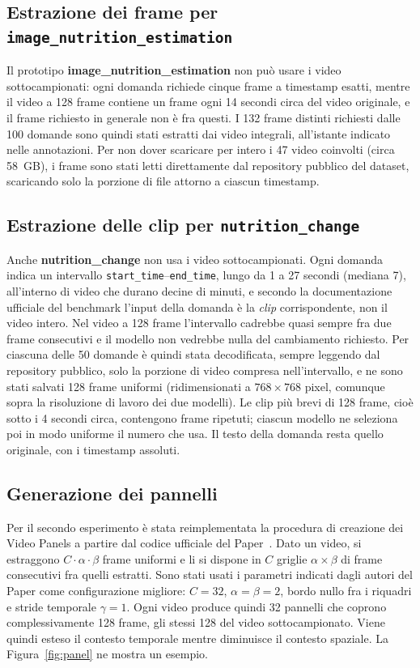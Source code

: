 \documentclass{article}
\begin{document}
\subsection{Estrazione dei frame per \texttt{image\_nutrition\_estimation}}

Il prototipo \textbf{image\_nutrition\allowbreak\_estimation} non può usare i video
sottocampionati: ogni domanda richiede cinque frame a timestamp esatti, mentre il
video a 128 frame contiene un frame ogni 14 secondi circa del video originale, e
il frame richiesto in generale non è fra questi. I 132 frame distinti richiesti
dalle 100 domande sono quindi stati estratti dai video integrali, all'istante
indicato nelle annotazioni. Per non dover scaricare per intero i 47 video
coinvolti (circa 58~GB), i frame sono stati letti direttamente dal repository
pubblico del dataset, scaricando solo la porzione di file attorno a ciascun
timestamp.

\subsection{Estrazione delle clip per \texttt{nutrition\_change}}

Anche \textbf{nutrition\allowbreak\_change} non usa i video sottocampionati. Ogni
domanda indica un intervallo \texttt{start\_time}--\texttt{end\_time}, lungo da 1 a
27 secondi (mediana 7), all'interno di video che durano decine di minuti, e
secondo la documentazione ufficiale del benchmark l'input della domanda è la
\emph{clip} corrispondente, non il video intero. Nel video a 128 frame
l'intervallo cadrebbe quasi sempre fra due frame consecutivi e il modello non
vedrebbe nulla del cambiamento richiesto. Per ciascuna delle 50 domande è quindi
stata decodificata, sempre leggendo dal repository pubblico, solo la porzione di
video compresa nell'intervallo, e ne sono stati salvati 128 frame uniformi
(ridimensionati a $768\times768$ pixel, comunque sopra la risoluzione di lavoro
dei due modelli). Le clip più brevi di 128 frame, cioè sotto i 4 secondi circa,
contengono frame ripetuti; ciascun modello ne seleziona poi in modo uniforme il
numero che usa. Il testo della domanda resta quello originale, con i timestamp
assoluti.

\subsection{Generazione dei pannelli}
\label{sec:panels-gen}

Per il secondo esperimento è stata reimplementata la procedura di creazione
dei Video Panels a partire dal codice ufficiale del Paper~\cite{videopanels}. Dato un video, si estraggono $C \cdot \alpha \cdot \beta$ frame
uniformi e li si dispone in $C$ griglie $\alpha \times \beta$ di frame
consecutivi fra quelli estratti. Sono stati usati i parametri indicati dagli autori del Paper come
configurazione migliore: $C=32$, $\alpha=\beta=2$, bordo nullo fra i riquadri e
stride temporale $\gamma=1$. Ogni video produce quindi 32 pannelli che coprono complessivamente 128 frame, gli stessi 128 del video
sottocampionato.  Viene quindi esteso il contesto temporale mentre diminuisce il contesto spaziale. La Figura~\ref{fig:panel} ne mostra un esempio.
\end{document}
